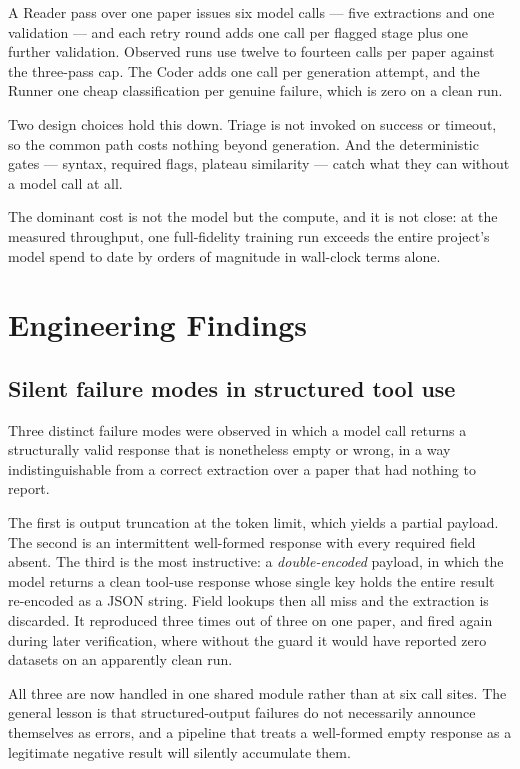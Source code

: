 \documentclass[11pt]{article}
\begin{document}
A Reader pass over one paper issues six model calls --- five extractions and one
validation --- and each retry round adds one call per flagged stage plus one further
validation. Observed runs use twelve to fourteen calls per paper against the three-pass
cap. The Coder adds one call per generation attempt, and the Runner one cheap
classification per genuine failure, which is zero on a clean run.

Two design choices hold this down. Triage is not invoked on success or timeout, so the
common path costs nothing beyond generation. And the deterministic gates --- syntax,
required flags, plateau similarity --- catch what they can without a model call at all.

The dominant cost is not the model but the compute, and it is not close: at the measured
throughput, one full-fidelity training run exceeds the entire project's model spend to
date by orders of magnitude in wall-clock terms alone.

\section{Engineering Findings}
\label{sec:findings}

\subsection{Silent failure modes in structured tool use}

Three distinct failure modes were observed in which a model call returns a structurally
valid response that is nonetheless empty or wrong, in a way indistinguishable from a
correct extraction over a paper that had nothing to report.

The first is output truncation at the token limit, which yields a partial payload.
The second is an intermittent well-formed response with every required field absent.
The third is the most instructive: a \emph{double-encoded} payload, in which the model
returns a clean tool-use response whose single key holds the entire result re-encoded as
a JSON string. Field lookups then all miss and the extraction is discarded. It reproduced
three times out of three on one paper, and fired again during later verification, where
without the guard it would have reported zero datasets on an apparently clean run.

All three are now handled in one shared module rather than at six call sites. The general
lesson is that structured-output failures do not necessarily announce themselves as
errors, and a pipeline that treats a well-formed empty response as a legitimate negative
result will silently accumulate them.
\end{document}
